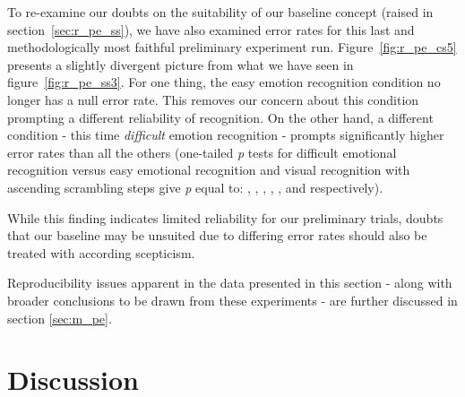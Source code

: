 	    To re-examine our doubts on the suitability of our baseline concept (raised in section~\ref{sec:r_pe_ss}), we have also examined error rates for this last and methodologically most faithful preliminary experiment run.
	    Figure~\ref{fig:r_pe_cs5} presents a slightly divergent picture from what we have seen in figure~\ref{fig:r_pe_ss3}.
	    For one thing, the easy emotion recognition condition no longer has a null error rate.
	    This removes our concern about this condition prompting a different reliability of recognition.
	    On the other hand, a different condition - this time \textit{difficult} emotion recognition - prompts significantly higher error rates than all the others
	    (one-tailed \textit{p} tests for difficult emotional recognition versus easy emotional recognition and visual recognition with ascending scrambling steps give \textit{p} equal to:
	    ,
	    ,
	    ,
	    ,
	    , and
	    respectively).
	    
	    While this finding indicates limited reliability for our preliminary trials, doubts that our baseline may be unsuited due to differing error rates should also be treated with according scepticism.
	    
	    Reproducibility issues apparent in the data presented in this section - along with broader conclusions to be drawn from these experiments - are further discussed in section \ref{sec:m_pe}.
\chapter{Discussion}
